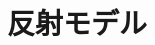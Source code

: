 \documentclass[../main]{subfiles}
\begin{document}
\section{反射モデル}
\label{sec:pmethod_model}
\end{document}
